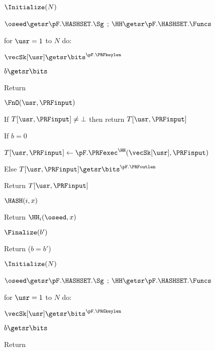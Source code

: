 \begin{figure}
	{
		
		\begin{oracle}{$\Initialize(N)$}
			\item $\oseed\getsr\pF.\HASHSET.\Sg$ ; 
			$\HH \getsr \pF.\HASHSET.\Funcs$
			\item for $\usr=1$ to $N$ do:
			\item \quad $\vecSk[\usr] \getsr \bits^{\pF.\PRFkeylen}$
			\item $b \getsr \bits$
			\item Return
		\end{oracle}
		\ExptSepSpace
		
		\begin{oracle}{$\FnO(\usr, \PRFinput)$}
			\item If $T[\usr, \PRFinput] \neq \bot$ then return $T[\usr, \PRFinput]$
			\item If $b = 0$
			\item \quad $T[\usr,\PRFinput] \gets \pF.\PRFexec^{\HH}(\vecSk[\usr], \PRFinput)$
			\item Else $T[\usr, \PRFinput] \getsr \bits^{\pF.\PRFoutlen}$
			\item Return $T[\usr, \PRFinput]$
		\end{oracle}
		\ExptSepSpace
		\begin{oracle}{$\HASH(i,x)$}
			\item Return $\HH_i(\oseed,x)$
		\end{oracle}
		\ExptSepSpace
		
		\begin{oracle}{$\Finalize(b')$}
			\item Return ($b=b'$) \vspace{2pt}
		\end{oracle}
	}{
		
		\begin{oracle}{$\Initialize(N)$}
			\item $\oseed\getsr\pF.\HASHSET.\Sg$ ; 
			$\HH \getsr \pF.\HASHSET.\Funcs$
			\item for $\usr =1$ to $N$ do:
			\item \quad $\vecSk[\usr] \getsr \bits^{\pF.\PRGkeylen}$
			\item $b \getsr \bits$
			\item Return
		\end{oracle}
		\ExptSepSpace
		
}
\end{figure}
